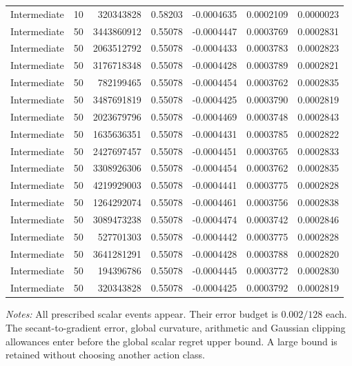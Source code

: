 \begin{longtable}{llrrrrr}
Intermediate & 10 & 320343828 & 0.58203 & -0.0004635 & 0.0002109 & 0.0000023 \\
Intermediate & 50 & 3443860912 & 0.55078 & -0.0004447 & 0.0003769 & 0.0002831 \\
Intermediate & 50 & 2063512792 & 0.55078 & -0.0004433 & 0.0003783 & 0.0002823 \\
Intermediate & 50 & 3176718348 & 0.55078 & -0.0004428 & 0.0003789 & 0.0002821 \\
Intermediate & 50 & 782199465 & 0.55078 & -0.0004454 & 0.0003762 & 0.0002835 \\
Intermediate & 50 & 3487691819 & 0.55078 & -0.0004425 & 0.0003790 & 0.0002819 \\
Intermediate & 50 & 2023679796 & 0.55078 & -0.0004469 & 0.0003748 & 0.0002843 \\
Intermediate & 50 & 1635636351 & 0.55078 & -0.0004431 & 0.0003785 & 0.0002822 \\
Intermediate & 50 & 2427697457 & 0.55078 & -0.0004451 & 0.0003765 & 0.0002833 \\
Intermediate & 50 & 3308926306 & 0.55078 & -0.0004454 & 0.0003762 & 0.0002835 \\
Intermediate & 50 & 4219929003 & 0.55078 & -0.0004441 & 0.0003775 & 0.0002828 \\
Intermediate & 50 & 1264292074 & 0.55078 & -0.0004461 & 0.0003756 & 0.0002838 \\
Intermediate & 50 & 3089473238 & 0.55078 & -0.0004474 & 0.0003742 & 0.0002846 \\
Intermediate & 50 & 527701303 & 0.55078 & -0.0004442 & 0.0003775 & 0.0002828 \\
Intermediate & 50 & 3641281291 & 0.55078 & -0.0004428 & 0.0003788 & 0.0002820 \\
Intermediate & 50 & 194396786 & 0.55078 & -0.0004445 & 0.0003772 & 0.0002830 \\
Intermediate & 50 & 320343828 & 0.55078 & -0.0004425 & 0.0003792 & 0.0002819 \\
\bottomrule
\end{longtable}
\begin{minipage}{0.97\linewidth}\footnotesize\emph{Notes:} All prescribed scalar events appear. Their error budget is $0.002/128$ each. The secant-to-gradient error, global curvature, arithmetic and Gaussian clipping allowances enter before the global scalar regret upper bound. A large bound is retained without choosing another action class.
\end{minipage}
